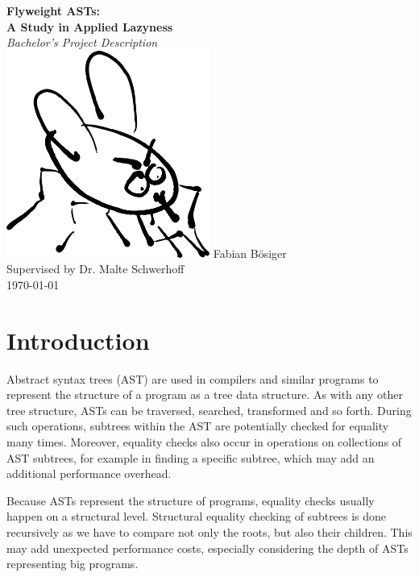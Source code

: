 \documentclass[11pt]{article}
\begin{document}
    \begin{titlepage}
        \begin{center}
            \textbf{\huge Flyweight ASTs:\\A Study in Applied Lazyness}\\
            \vspace{0.2cm}
            \textit{Bachelor's Project Description}\\
            \vspace{1cm}
            \includegraphics[width=0.5\textwidth]{fly}
            \vfill   
            Fabian Bösiger\\
            Supervised by Dr. Malte Schwerhoff\\
            \vspace{0.2cm}
            \today
        \end{center}
    \end{titlepage}
    \newpage

    \section{Introduction} \label{introduction}
    Abstract syntax trees (AST) are used in compilers and similar programs to represent
    the structure of a program as a tree data structure. As with any other tree structure,
    ASTs can be traversed, searched, transformed and so forth. During such operations,
    subtrees within the AST are potentially checked for equality many times.  Moreover, equality checks
    also occur in operations on collections of AST subtrees, for example in finding
    a specific subtree, which may add an additional performance overhead.
    
    Because ASTs represent the structure of programs, equality checks usually happen on a structural level.
    Structural equality checking of subtrees is done recursively as we have to compare not only the roots, but also their children. This may add unexpected performance costs,
    especially considering the depth of ASTs representing big programs.
\end{document}
